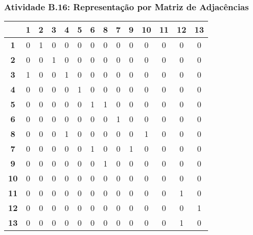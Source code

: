\documentclass[a4paper,12pt]{article}
\begin{document}
\subsubsection*{Atividade B.16: Representação por Matriz de Adjacências}
\begin{center}
\tiny
\begin{tabular*}{\textwidth}{c|@{\extracolsep{\fill}}ccccccccccccc}
\rowcolor[gray]{0.9}
 & \textbf{1} & \textbf{2} & \textbf{3} & \textbf{4} & \textbf{5} & \textbf{6} & \textbf{8} & \textbf{7} & \textbf{9} & \textbf{10} & \textbf{11} & \textbf{12} & \textbf{13} \\
\hline
\textbf{1} & 0 & 1 & 0 & 0 & 0 & 0 & 0 & 0 & 0 & 0 & 0 & 0 & 0 \\
\textbf{2} & 0 & 0 & 1 & 0 & 0 & 0 & 0 & 0 & 0 & 0 & 0 & 0 & 0 \\
\textbf{3} & 1 & 0 & 0 & 1 & 0 & 0 & 0 & 0 & 0 & 0 & 0 & 0 & 0 \\
\textbf{4} & 0 & 0 & 0 & 0 & 1 & 0 & 0 & 0 & 0 & 0 & 0 & 0 & 0 \\
\textbf{5} & 0 & 0 & 0 & 0 & 0 & 1 & 1 & 0 & 0 & 0 & 0 & 0 & 0 \\
\textbf{6} & 0 & 0 & 0 & 0 & 0 & 0 & 0 & 1 & 0 & 0 & 0 & 0 & 0 \\
\textbf{8} & 0 & 0 & 0 & 1 & 0 & 0 & 0 & 0 & 0 & 1 & 0 & 0 & 0 \\
\textbf{7} & 0 & 0 & 0 & 0 & 0 & 1 & 0 & 0 & 1 & 0 & 0 & 0 & 0 \\
\textbf{9} & 0 & 0 & 0 & 0 & 0 & 0 & 1 & 0 & 0 & 0 & 0 & 0 & 0 \\
\textbf{10} & 0 & 0 & 0 & 0 & 0 & 0 & 0 & 0 & 0 & 0 & 0 & 0 & 0 \\
\textbf{11} & 0 & 0 & 0 & 0 & 0 & 0 & 0 & 0 & 0 & 0 & 0 & 1 & 0 \\
\textbf{12} & 0 & 0 & 0 & 0 & 0 & 0 & 0 & 0 & 0 & 0 & 0 & 0 & 1 \\
\textbf{13} & 0 & 0 & 0 & 0 & 0 & 0 & 0 & 0 & 0 & 0 & 0 & 1 & 0 \\
\end{tabular*}
\end{center}
\end{document}
